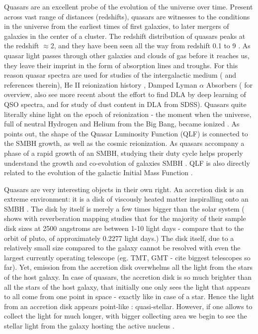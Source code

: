 \documentclass[modern]{aastex62}
\begin{document}
Quasars are an excellent probe of the evolution of the universe over time. Present across vast range of distances (redshifts), quasars are witnesses to the conditions in the universe from the earliest times of first galaxies, to later mergers of galaxies in the center  of a cluster.  The redshift distribution of quasars peaks at the redshift $\approx$2, and they have been seen all the way from redshift 0.1 to 9 \citep{paris2017}. As quasar light passes through other galaxies and clouds of gas before it reaches us, they leave their imprint  in the form of absorption lines and troughs.  For this reason quasar spectra are used  for studies of the intergalactic medium (\cite{prochaska2014} and references therein),  He II reionization history \citep{khrykin2017} , Damped Lyman $\alpha$ Absorbers (\cite{wolfe2005} for overview, also see more recent \cite{parks2018} about the effort to find DLA by deep learning of QSO spectra, and \cite{murphy2016} for study of  dust content in DLA from SDSS).  Quasars quite literally shine light on the epoch of reionization - the moment when the universe, full of neutral Hydrogen and Helium from the Big Bang, became ionized \citep{glikman2011, masters2012, ross2013}. As  \cite{alsayyad2016} points out, the shape of the Quasar Luminosity Function (QLF) is connected to the SMBH growth, as well as the cosmic reionization. As quasars accompany a phase of a rapid growth of an SMBH, studying their duty cycle helps properly understand the growth and co-evolution of  galaxies SMBH \citep{schawinski2012}.  QLF is also directly related to the evolution of the galactic Initial Mass Function \citep{mcgreer2013}. 

Quasars are very interesting objects in their own right. An accretion disk is an extreme environment: it is a disk of viscously heated matter inspiralling onto an SMBH \citep{ruan2017}. The disk by itself is merely a few times bigger than the solar system (\citep{mudd2017} shows with reverberation mapping studies that for the majority of their sample disk sizes at 2500 angstroms are between 1-10 light days - compare that to the orbit of pluto, of approximately 0.2277 light days.) The disk itself, due to a relatively small size compared to the galaxy cannot be resolved with even the largest currently operating telescope (eg. TMT, GMT - cite biggest telescopes so far).  Yet, emission from the accretion disk overwhelms all the light from the stars of the host galaxy.   In case of quasars, the accretion disk is so much brighter than all the stars of the host galaxy, that initially one only sees the light that appears to all come from one point in space - exactly like in case of a star. Hence the light from an accretion disk appears point-like : quasi-stellar. However,  if one allows to collect the light for much longer, with bigger collecting area  we begin to see the stellar light from the galaxy hosting the active nucleus \citep{hutchings2002,kotilainen2013, falomo2014, liuzzo2016, bayliss2017}. 
\end{document}
